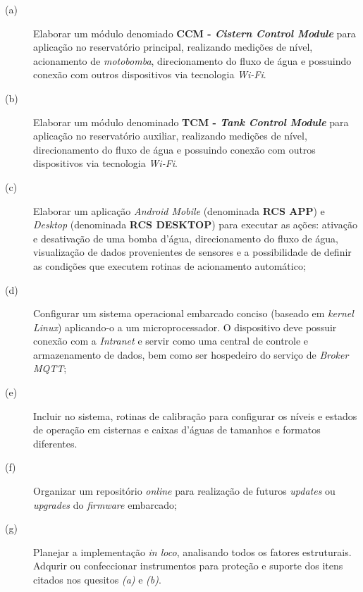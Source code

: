 \begin{description}
	\item [(a)] Elaborar um módulo denomiado \textbf{CCM - \textit{Cistern Control Module}} para aplicação no reservatório principal, realizando medições de nível, acionamento de \textit{motobomba}, direcionamento do fluxo de água e possuindo conexão com outros dispositivos via tecnologia \textit{ Wi-Fi}.
	\item [(b)] Elaborar um módulo denominado \textbf{TCM - \textit{Tank Control Module}} para aplicação no reservatório auxiliar, realizando medições de nível, direcionamento do fluxo de água e possuindo conexão com outros dispositivos via tecnologia \textit{Wi-Fi}.
	\item [(c)] Elaborar um aplicação \textit{Android Mobile} (denominada \textbf{RCS APP}) e \textit{Desktop} (denominada \textbf{RCS DESKTOP}) para executar as ações: ativação e desativação de uma bomba d'água, direcionamento do fluxo de água, visualização de dados provenientes de sensores e a possibilidade de definir as condições que executem rotinas de acionamento automático;
	\item [(d)] Configurar um sistema operacional embarcado conciso (baseado em \textit{kernel Linux}) aplicando-o a um microprocessador. O dispositivo deve possuir conexão com a \textit{Intranet} e servir como uma central de controle e armazenamento de dados, bem como ser hospedeiro do serviço de \textit{Broker MQTT};
	\item [(e)] Incluir no sistema, rotinas de calibração para configurar os níveis e estados de operação em cisternas e caixas d'águas de tamanhos e formatos diferentes.
	\item [(f)] Organizar um repositório \textit{online} para realização de futuros \textit{updates} ou \textit{upgrades} do \textit{firmware} embarcado;
	\item [(g)] Planejar a implementação \textit{in loco},  analisando todos os fatores estruturais. Adqurir ou confeccionar instrumentos para proteção e suporte dos itens citados nos quesitos \textit{(a)} e \textit{(b)}.
\end{description}

\label{sec:objetivosespecificos}